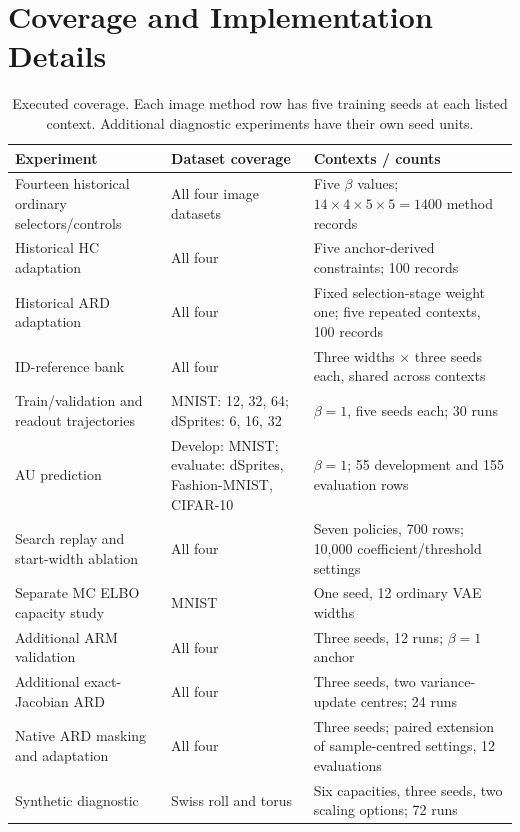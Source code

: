 \documentclass[make,article,submit,pdftex,moreauthors]{Definitions/mdpi}
\begin{document}
\section{Coverage and Implementation Details}\label{app:coverage}
\begin{table}[H]
\caption{Executed coverage. Each image method row has five training
seeds at each listed context. Additional diagnostic experiments have
their own seed units.}
\label{tab:coverage}\small
\begin{tabularx}{\textwidth}{>{\raggedright\arraybackslash}p{}>{\raggedright\arraybackslash}p{}>{\raggedright\arraybackslash}X}\toprule
Experiment & Dataset coverage & Contexts / counts \\\midrule
Fourteen historical ordinary selectors/controls & All four image datasets & Five $\beta$ values; $14\times4\times5\times5=1400$ method records \\
Historical HC adaptation & All four & Five anchor-derived constraints; 100 records \\
Historical ARD adaptation & All four & Fixed selection-stage weight one; five repeated contexts, 100 records \\
ID-reference bank & All four & Three widths $\times$ three seeds each, shared across contexts \\
Train/validation and readout trajectories & MNIST: 12, 32, 64; dSprites: 6, 16, 32 & $\beta=1$, five seeds each; 30 runs \\
AU prediction & Develop: MNIST; evaluate: dSprites, Fashion-MNIST, CIFAR-10 & $\beta=1$; 55 development and 155 evaluation rows \\
Search replay and start-width ablation & All four & Seven policies, 700 rows; 10,000 coefficient/threshold settings \\
Separate MC ELBO capacity study & MNIST & One seed, 12 ordinary VAE widths \\
Additional ARM validation & All four & Three seeds, 12 runs; $\beta=1$ anchor \\
Additional exact-Jacobian ARD & All four & Three seeds, two variance-update centres; 24 runs \\
Native ARD masking and adaptation & All four & Three seeds; paired extension of sample-centred settings, 12 evaluations \\
Synthetic diagnostic & Swiss roll and torus & Six capacities, three seeds, two scaling options; 72 runs \\
\bottomrule\end{tabularx}
\end{table}
\end{document}
